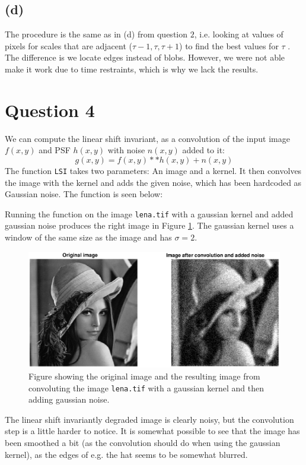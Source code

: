 \documentclass[a4paper]{article}
\begin{document}
\subsection*{(d)}
The procedure is the same as in (d) from question $2$, i.e. looking at values of pixels for scales that are adjacent ($\tau-1, \tau, \tau+1$) to find the best values for $\tau$ . The difference is we locate edges instead of blobs. However, we were not able make it work due to time restraints, which is why we lack the results.

\section*{Question 4}
We can compute the linear shift invariant, as a convolution of the input image $f(x,y)$ and PSF $h(x,y)$ with noise $n(x,y)$ added to it:
$$
  g(x,y) = f(x,y) ** h(x,y) + n(x,y)
$$
The function \texttt{LSI} takes two parameters: An image and a kernel. It then convolves the image with the kernel and adds the given noise, which has been hardcoded as Gaussian noise. The function is seen below:

Running the function on the image \texttt{lena.tif} with a gaussian kernel and added gaussian noise produces the right image in Figure \ref{q4_1}. The gaussian kernel uses a window of the same size as the image and has $\sigma=2$.
\begin{figure}[H]
  \centering
  \captionsetup{justification=centering}
\includegraphics[width=\textwidth]{q4_1.eps}
\caption{Figure showing the original image and the resulting image from convoluting the image \texttt{lena.tif} with a gaussian kernel and then adding gaussian noise.}
  \label{q4_1}
\end{figure}
The linear shift invariantly degraded image is clearly noisy, but the convolution step is a little harder to notice. It is somewhat possible to see that the image has been smoothed a bit (as the convolution should do when using the gaussian kernel), as the edges of e.g. the hat seems to be somewhat blurred.
\end{document}
